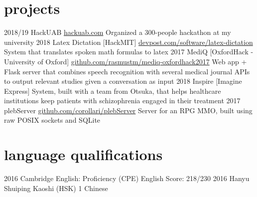 \documentclass[]{friggeri-cv}
\begin{document}
\break

\section{projects}

\begin{entrylist}
  \entry
    {2018/19}
    {HackUAB}
    {\href{https://hackuab.com}{hackuab.com}}
    {Organized a 300-people hackathon at my university}
  \entry
    {2018}
    {Latex Dictation [HackMIT]}
    {\href{https://devpost.com/software/latex-dictation}{devpost.com/software/latex-dictation}}
    {System that translates spoken math formulas to latex}
  \entry
    {2017}
    {MediQ [OxfordHack - University of Oxford]}
    {\href{https://github.com/rasmustm/mediq-oxfordhack2017}{github.com/rasmustm/mediq-oxfordhack2017}}
    {Web app + Flask server that combines speech recognition with several medical journal APIs to output relevant studies given a conversation as input}
  \entry
    {2018}
    {Inspire [Imagine Express]}
    {}{System, built with a team from Otsuka, that helps healthcare institutions keep patients with schizophrenia engaged in their treatment}
  \entry
    {2017}
    {plebServer}
    {\href{https://github.com/corollari/plebServer}{github.com/corollari/plebServer}}
    {Server for an RPG MMO, built using raw POSIX sockets and SQLite}
\end{entrylist}

\section{language qualifications}

\begin{entrylist}
  \entry
    {2016}
    {Cambridge English: Proficiency (CPE)}
    {English}
    {Score: 218/230}
  \entrynodesc
    {2016}
    {Hanyu Shuiping Kaoshi (HSK) 1}
    {Chinese}
\end{entrylist}
%
% 
\end{document}
